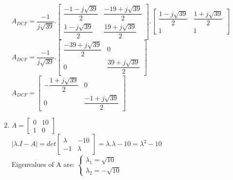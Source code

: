 \documentclass[14pt,a4paper]{article}
\begin{document}
\begin{enumerate}
		$A_{DCF} = \dfrac{-1}{j\sqrt{39}} .\begin{bmatrix} \dfrac{-1-j\sqrt{39}}{2} & \dfrac{-19+j\sqrt{39}}{2} \\ \dfrac{1-j\sqrt{39}}{2} & \dfrac{19+j\sqrt{39}}{2} \end{bmatrix} .\begin{bmatrix} \dfrac{1-j\sqrt{39}}{2} & \dfrac{1+j\sqrt{39}}{2} \\ 1&1 \end{bmatrix} $ \\
		
		$A_{DCF} = \dfrac{-1}{j\sqrt{39}} .\begin{bmatrix} \dfrac{-39+j\sqrt{39}}{2} & 0 \\ 0 &  \dfrac{39+j\sqrt{39}}{2} \end{bmatrix} $ \\
		
		$A_{DCF} = \begin{bmatrix} -\dfrac{1+j\sqrt{39}}{2} & 0 \\ 0 &  \dfrac{-1+j\sqrt{39}}{2} \end{bmatrix} $ \\
		
	\item
	$A = \begin{bmatrix} 0&10 \\ 1&0 \end{bmatrix} $ \\
	$|\lambda .I - A| = det\begin{bmatrix} \lambda & -10 \\ -1 & \lambda \end{bmatrix} = \lambda .\lambda-10 = \lambda^2 -10 $ \\
	Eigenvalues of A are: 
	$\begin{cases} \lambda_1 = \sqrt{10}  \\ \lambda_2 = -\sqrt{10} \end{cases} $ \\
	

\end{enumerate}
\end{document}
